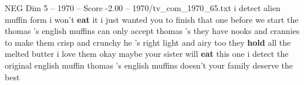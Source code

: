 \begin{textsample}{NEG Dim 5 – 1970 – Score -2.00 – 1970/tv\_com\_1970\_65.txt}  \label{ex:f5_neg_058}
i detect alien muffin form i won't \textbf{eat} it i just wanted you to finish that one before we start the thomas 's english muffins can only accept thomas 's they have nooks and crannies to make them crisp and crunchy he 's right light and airy too they \textbf{hold} all the melted butter i love them okay maybe your sister will \textbf{eat} this one i detect the original english muffin thomas 's english muffins doesn't your family deserve the best

\end{textsample}
